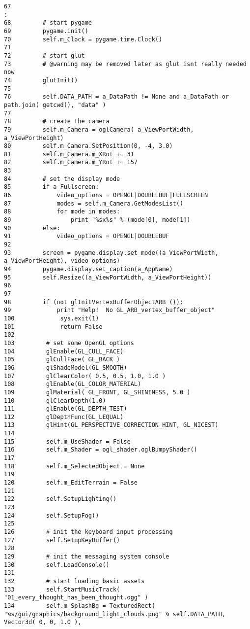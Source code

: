 \begin{Code}\begin{verbatim}67                                                                                                                               :
68         # start pygame
69         pygame.init()
70         self.m_Clock = pygame.time.Clock()
71 
72         # start glut
73         # @warning may be removed later as glut isnt really needed now
74         glutInit()
75 
76         self.DATA_PATH = a_DataPath != None and a_DataPath or path.join( getcwd(), "data" )
77 
78         # create the camera
79         self.m_Camera = oglCamera( a_ViewPortWidth, a_ViewPortHeight)
80         self.m_Camera.SetPosition(0, -4, 3.0)
81         self.m_Camera.m_XRot += 31
82         self.m_Camera.m_YRot += 157
83         
84         # set the display mode
85         if a_Fullscreen:
86             video_options = OPENGL|DOUBLEBUF|FULLSCREEN
87             modes = self.m_Camera.GetModesList()
88             for mode in modes:
89                 print "%sx%s" % (mode[0], mode[1]) 
90         else:
91             video_options = OPENGL|DOUBLEBUF
92 
93         screen = pygame.display.set_mode((a_ViewPortWidth, a_ViewPortHeight), video_options)
94         pygame.display.set_caption(a_AppName)
95         self.Resize((a_ViewPortWidth, a_ViewPortHeight))
96 
97 
98         if (not glInitVertexBufferObjectARB ()):
99             print "Help!  No GL_ARB_vertex_buffer_object"
100             sys.exit(1)
101             return False
102         
103         # set some OpenGL options
104         glEnable(GL_CULL_FACE)
105         glCullFace( GL_BACK )
106         glShadeModel(GL_SMOOTH)
107         glClearColor( 0.5, 0.5, 1.0, 1.0 )
108         glEnable(GL_COLOR_MATERIAL)
109         glMaterial( GL_FRONT, GL_SHININESS, 5.0 )
110         glClearDepth(1.0)
111         glEnable(GL_DEPTH_TEST)
112         glDepthFunc(GL_LEQUAL)
113         glHint(GL_PERSPECTIVE_CORRECTION_HINT, GL_NICEST)
114 
115         self.m_UseShader = False
116         self.m_Shader = ogl_shader.oglBumpyShader()
117 
118         self.m_SelectedObject = None
119 
120         self.m_EditTerrain = False
121 
122         self.SetupLighting()
123 
124         self.SetupFog()
125 
126         # init the keyboard input processing
127         self.SetupKeyBuffer()
128 
129         # init the messaging system console
130         self.LoadConsole()
131 
132         # start loading basic assets
133         self.StartMusicTrack( "01_every_thought_has_been_thought.ogg" )
134         self.m_SplashBg = TexturedRect( "%s/gui/graphics/background_light_clouds.png" % self.DATA_PATH, Vector3d( 0, 0, 1.0 ), 

\end{verbatim}
\end{Code}
